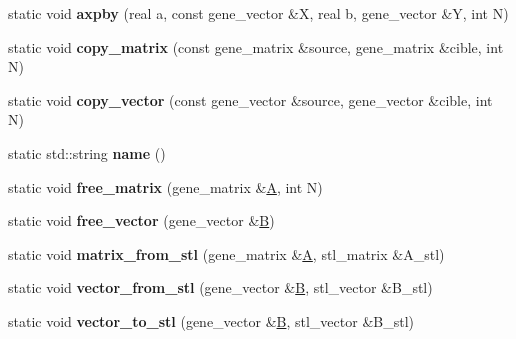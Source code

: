 \begin{DoxyCompactItemize}
\mbox{\label{classblaze__interface_a301efbd4d0269426e49e560ab594ab2b}} 
static void {\bfseries axpby} (real a, const gene\+\_\+vector \&X, real b, gene\+\_\+vector \&Y, int N)
\item 
\mbox{\label{classblaze__interface_a84778950c524019b0fb5e554bcfcacb2}} 
static void {\bfseries copy\+\_\+matrix} (const gene\+\_\+matrix \&source, gene\+\_\+matrix \&cible, int N)
\item 
\mbox{\label{classblaze__interface_ad1af38b455850b4af1e4f421a705c212}} 
static void {\bfseries copy\+\_\+vector} (const gene\+\_\+vector \&source, gene\+\_\+vector \&cible, int N)
\item 
\mbox{\label{classblaze__interface_a801e615649439fe5dd6f8098b7cef133}} 
static std\+::string {\bfseries name} ()
\item 
\mbox{\label{classblaze__interface_a7da64c1944a0e84895fef1a9eed4adac}} 
static void {\bfseries free\+\_\+matrix} (gene\+\_\+matrix \&\hyperlink{group___core___module_class_eigen_1_1_matrix}{A}, int N)
\item 
\mbox{\label{classblaze__interface_aa36658d0f96c773ac99e9dc4ab154f79}} 
static void {\bfseries free\+\_\+vector} (gene\+\_\+vector \&\hyperlink{group___core___module_class_eigen_1_1_matrix}{B})
\item 
\mbox{\label{classblaze__interface_a21ac5c9d6773829f2ed0d7d85bf59ef0}} 
static void {\bfseries matrix\+\_\+from\+\_\+stl} (gene\+\_\+matrix \&\hyperlink{group___core___module_class_eigen_1_1_matrix}{A}, stl\+\_\+matrix \&A\+\_\+stl)
\item 
\mbox{\label{classblaze__interface_af15b1051a78fba611b4b83a5a104e26d}} 
static void {\bfseries vector\+\_\+from\+\_\+stl} (gene\+\_\+vector \&\hyperlink{group___core___module_class_eigen_1_1_matrix}{B}, stl\+\_\+vector \&B\+\_\+stl)
\item 
\mbox{\label{classblaze__interface_a6c15bf598d55aa8ae1d795f75c60e036}} 
static void {\bfseries vector\+\_\+to\+\_\+stl} (gene\+\_\+vector \&\hyperlink{group___core___module_class_eigen_1_1_matrix}{B}, stl\+\_\+vector \&B\+\_\+stl)

\end{DoxyCompactItemize}
